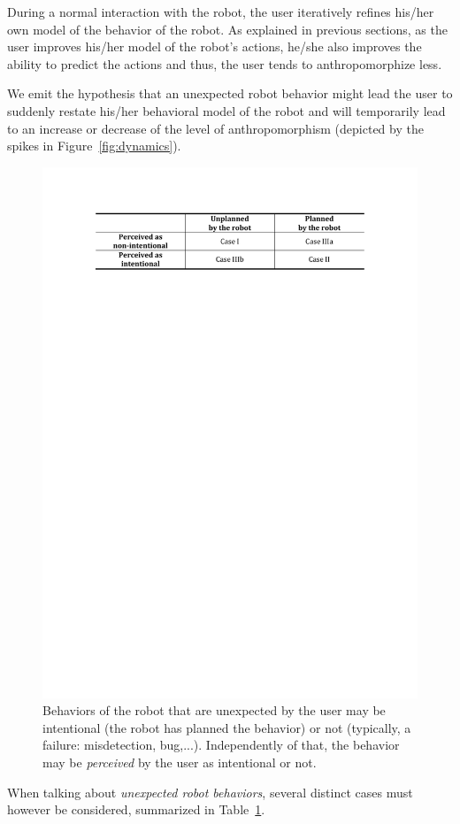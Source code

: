\documentclass{frontiersSCNS} %
\begin{document}
During a normal interaction with the robot, the user iteratively refines his/her
own model of the behavior of the robot. As explained in previous sections, as
the user improves his/her model of the robot's actions, he/she also improves the
ability to predict the actions and thus, the user tends to anthropomorphize
less.

We emit the hypothesis that an unexpected robot behavior might lead the user to
suddenly restate his/her behavioral model of the robot and will temporarily lead
to an increase or decrease of the level of anthropomorphism (depicted by the
spikes in Figure~\ref{fig:dynamics}).

\begin{figure}
    \centering
    \includegraphics[width=0.75\columnwidth]{un-expected-behavior.pdf}
    \caption{Behaviors of the robot that are unexpected by the user may be intentional
    (the robot has planned the behavior) or not (typically, a failure:
    misdetection, bug,...). Independently of that, the behavior may be
    \emph{perceived} by the user as intentional or not.}

    \label{fig:perceptionUnexpectedBehavior}
\end{figure}


When talking about \emph{unexpected robot behaviors}, several distinct cases
must however be considered, summarized in
Table~\ref{fig:perceptionUnexpectedBehavior}.
\end{document}
